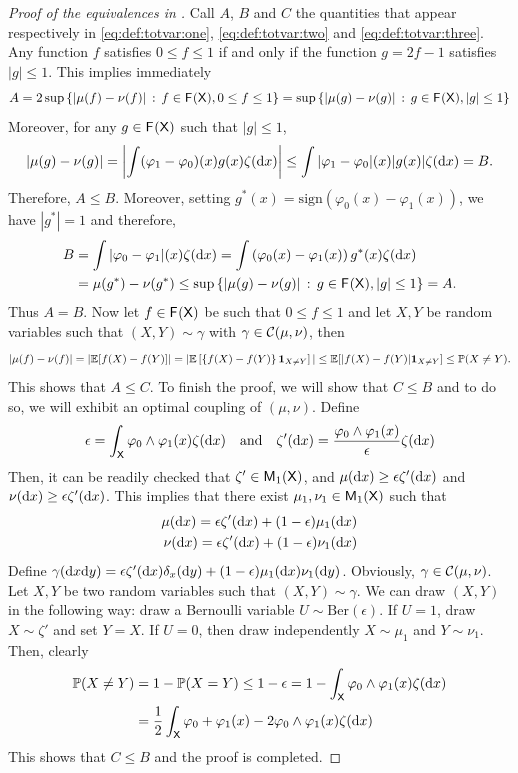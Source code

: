 \documentclass[english,graybox,envcountchap,envcountsame,sectrefs,shortlabels]{svmono}
\theoremstyle{style}
\begin{document}
\begin{proof}[Proof of the equivalences in ] Call $A$, $B$ and $C$ the quantities that appear respectively in \eqref{eq:def:totvar:one}, \eqref{eq:def:totvar:two} and \eqref{eq:def:totvar:three}.
Any function $f$ satisfies $0\leq f\leq 1$ if and only if  the function $g=2f-1$ satisfies $|g| \leq 1$. This implies immediately
$$
A=2\sup\left\{ |\mu(f)-\nu(f)|\,:\,f\in \mathsf{F_{}}(\mathsf{X}), 0\leq f\leq 1\right\}=\sup\left\{ |\mu(g)-\nu(g)|\,:\,g\in \mathsf{F_{}}(\mathsf{X}), |g|\leq 1\right\}
$$
Moreover, for any $g\in \mathsf{F_{}}(\mathsf{X})$ such that $|g|\leq 1$,
$$
|\mu(g)-\nu(g)|=\left|\int (\varphi_1-\varphi_0)(x)g(x) \zeta(\mathrm{d} x) \right|\leq \int |\varphi_1-\varphi_0|(x)|g(x)| \zeta(\mathrm{d} x)=B.
$$
Therefore, $A\leq B$. Moreover, setting $g^*(x)=\mathrm{sign}(\varphi_0(x)-\varphi_1(x))$, we have $|g^*|=1$ and therefore,
\begin{align*}
B&=\int |\varphi_0-\varphi_1|(x) \zeta(\mathrm{d} x)=\int  \left(\varphi_0(x)-\varphi_1(x)\right){g^*(x)} \zeta(\mathrm{d} x)\\
 &= \mu(g^*) -\nu(g^*)\leq \sup\left\{ |\mu(g)-\nu(g)|\,:\,g\in \mathsf{F_{}}(\mathsf{X}), |g|\leq 1\right\}=A.
\end{align*}
Thus $A=B$. Now let $f\in \mathsf{F_{}}(\mathsf{X})$ be such that $0\leq f\leq 1$ and let $X,Y$ be random variables such that $(X,Y)\sim \gamma$ with $\gamma\in \mathcal{C}(\mu,\nu)$, then
$$
|\mu(f)-\nu(f)|=|\mathbb{E}[f(X)-f(Y)]|=|\mathbb{E}\left[\left\{ f(X)-f(Y)\right\}\mathbf{1}_{X\neq Y}\right]|\leq \mathbb{E}[|f(X)-f(Y)|\mathbf{1}_{X\neq Y}] \leq \mathbb{P}(X\neq Y).
$$
This shows that $A\leq C$. To finish the proof, we will show that $C\leq B$ and to do so, we will exhibit an optimal coupling of $(\mu,\nu)$. 
Define
$$
\epsilon=\int_{\mathsf{X}} \varphi_0\wedge \varphi_1(x) \zeta(\mathrm{d} x) \quad \mbox{and} \quad  \zeta'(\mathrm{d} x)=\frac{\varphi_0\wedge \varphi_1(x) }{\epsilon}\zeta(\mathrm{d} x)
$$
Then, it can be readily checked that $\zeta'\in \mathsf{M}_{1}(\mathsf{X})$, and $\mu(\mathrm{d} x)\geq \epsilon \zeta'(\mathrm{d} x)$ and $\nu(\mathrm{d} x)\geq \epsilon \zeta'(\mathrm{d} x)$. This implies that there exist $\mu_1,\nu_1\in\mathsf{M}_{1}(\mathsf{X})$ such that
\begin{align*}
\mu(\mathrm{d} x)=\epsilon \zeta'(\mathrm{d} x) + (1-\epsilon) \mu_1(\mathrm{d} x)\\
\nu(\mathrm{d} x)=\epsilon \zeta'(\mathrm{d} x) + (1-\epsilon) \nu_1(\mathrm{d} x)
\end{align*}
Define $\gamma(\mathrm{d} x\mathrm{d} y)=\epsilon \zeta'(\mathrm{d} x) \delta _x(\mathrm{d} y)+(1-\epsilon) \mu_1(\mathrm{d} x) \nu_1(\mathrm{d} y)$. Obviously, $\gamma \in \mathcal{C}(\mu,\nu)$. Let $X,Y$ be two random variables such that $(X,Y)\sim\gamma$. We can draw $(X,Y)$ in the following way: draw a Bernoulli variable $U\sim \mathrm{Ber}(\epsilon)$. If $U=1$, draw $X\sim\zeta'$ and set $Y=X$. If $U=0$, then draw independently $X\sim \mu_1$ and $Y\sim \nu_1$. Then, clearly
\begin{align*}
\mathbb{P}(X\neq Y)&=1-\mathbb{P}(X=Y) \leq 1-\epsilon=1-\int_{\mathsf{X}} \varphi_0\wedge \varphi_1(x) \zeta(\mathrm{d} x)\\
&=\frac{1}{2}\int_{\mathsf{X}} \varphi_0+ \varphi_1(x)-2 \varphi_0\wedge \varphi_1(x)\zeta(\mathrm{d} x)
\end{align*}
This shows that $C\leq B$ and the proof is completed.
\end{proof}
\end{document}
